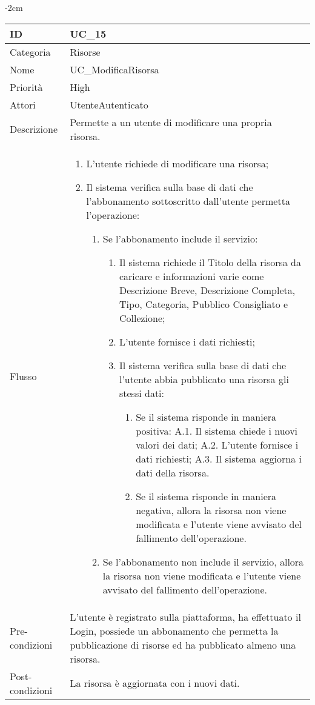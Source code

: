 \begin{center}
\begin{table}[bp]
    \centering
    \addtolength{\leftskip} {-2cm}
\begin{tabular}{ |p{2.6cm}|p{13cm}|  }
\hline
ID & UC\_15 \\\hline
Categoria & Risorse\\\hline
Nome & UC\_ModificaRisorsa\\\hline
Priorità & High \\\hline
Attori &  UtenteAutenticato \\\hline
Descrizione & Permette a un utente di modificare una propria risorsa.\\\hline
Flusso &  	\vspace{-5mm} \begin{enumerate}
			\item L'utente richiede di modificare una risorsa;
			\item Il sistema verifica sulla base di dati che l'abbonamento sottoscritto dall'utente permetta l'operazione:
			\begin{enumerate}
				\item Se l'abbonamento include il servizio:
				\begin{enumerate}
					\item Il sistema richiede il Titolo della risorsa da caricare e informazioni varie come Descrizione Breve,  Descrizione Completa, Tipo, Categoria, Pubblico Consigliato e Collezione;
					\item L'utente fornisce i dati richiesti;
					\item Il sistema verifica sulla base di dati che l'utente abbia pubblicato una risorsa gli stessi dati:
					\begin{enumerate}
						\item Se il sistema risponde in maniera positiva:
							\subitem A.1. Il sistema chiede i nuovi valori dei dati;
							\subitem A.2. L'utente fornisce i dati richiesti;
							\subitem A.3. Il sistema aggiorna i dati della risorsa.
						\item Se il sistema risponde in maniera negativa, allora  la risorsa non viene modificata e l'utente viene avvisato del fallimento dell'operazione.
					\end{enumerate}
				\end{enumerate}
				\item Se l'abbonamento non include il servizio, allora la risorsa non viene modificata e l'utente viene avvisato del fallimento dell'operazione.
			\end{enumerate}
		\end{enumerate}\\\hline
Pre-condizioni & L'utente è registrato sulla piattaforma, ha effettuato il Login, possiede un abbonamento che permetta la pubblicazione di risorse ed ha pubblicato almeno una risorsa.\\\hline
Post-condizioni & La risorsa è aggiornata con i nuovi dati.\\\hline
\end{tabular}
\label{table_use_case:15}\newline
\end{table}


\end{center}